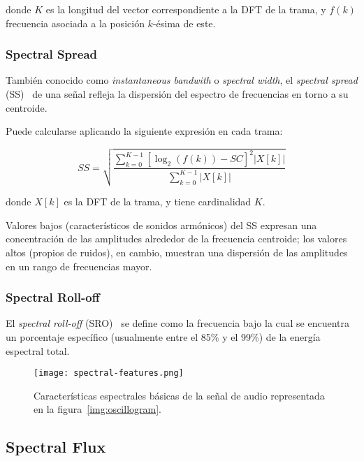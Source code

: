 \noindent
donde $K$ es la longitud del vector correspondiente a la DFT de la trama, y $f(k)$ frecuencia asociada a la posición $k$-ésima de este.

\subsubsection{Spectral Spread}

También conocido como \textit{instantaneous bandwith} o \textit{spectral width}, el \textit{spectral spread} (SS)~\cite{Fagerlund07,Kim05,Manjunath02,Peters04} de una señal refleja la dispersión del espectro de frecuencias en torno a su centroide.

Puede calcularse aplicando la siguiente expresión en cada trama:

\begin{equation}
    \label{eq:SS}
    SS = \sqrt{\frac{\sum_{k=0}^{K-1}{\left[ \log_{2}{(f(k))-SC} \right]^2 |X[k]|}}{\sum_{k=0}^{K-1}{|X[k]|}}}
\end{equation}

\noindent
donde $X[k]$ es la DFT de la trama, y tiene cardinalidad $K$.

Valores bajos (característicos de sonidos armónicos) del SS expresan una concentración de las amplitudes alrededor de la frecuencia centroide;
los valores altos (propios de ruidos), en cambio, muestran una dispersión de las amplitudes en un rango de frecuencias mayor.

\subsubsection{Spectral Roll-off}

El \textit{spectral roll-off} (SRO)~\cite{Fagerlund07,Peters04} se define como la frecuencia bajo la cual se encuentra un porcentaje específico (usualmente entre el 85\% y el 99\%) de la energía espectral total.

\begin{figure}[!h]
    \centering
    \texttt{[image: spectral-features.png]}
    \caption{Características espectrales básicas de la señal de audio representada en la figura~\ref{img:oscillogram}.}
    \label{img:basic-spectral-descriptors}
\end{figure}

\subsection{Spectral Flux}\label{subsec:spectralFlux}

